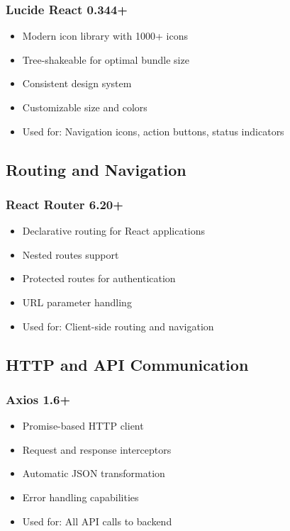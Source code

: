 \subsubsection{Lucide React 0.344+}
\begin{itemize}[leftmargin=*]
    \item Modern icon library with 1000+ icons
    \item Tree-shakeable for optimal bundle size
    \item Consistent design system
    \item Customizable size and colors
    \item Used for: Navigation icons, action buttons, status indicators
\end{itemize}

\subsection{Routing and Navigation}

\subsubsection{React Router 6.20+}
\begin{itemize}[leftmargin=*]
    \item Declarative routing for React applications
    \item Nested routes support
    \item Protected routes for authentication
    \item URL parameter handling
    \item Used for: Client-side routing and navigation
\end{itemize}

\subsection{HTTP and API Communication}

\subsubsection{Axios 1.6+}
\begin{itemize}[leftmargin=*]
    \item Promise-based HTTP client
    \item Request and response interceptors
    \item Automatic JSON transformation
    \item Error handling capabilities
    \item Used for: All API calls to backend
\end{itemize}

